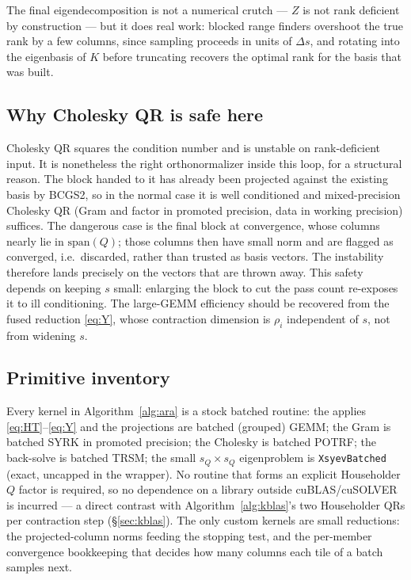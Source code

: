 \documentclass[11pt]{article}
\begin{document}
The final eigendecomposition is not a numerical crutch --- $Z$ is not rank
deficient by construction --- but it does real work: blocked range finders
overshoot the true rank by a few columns, since sampling proceeds in units of
$\Delta s$, and rotating into the eigenbasis of $K$ before truncating recovers
the optimal rank for the basis that was built.

\subsection{Why Cholesky QR is safe here}
\label{sec:cholqr}

Cholesky QR squares the condition number and is unstable on rank-deficient input.
It is nonetheless the right orthonormalizer inside this loop, for a structural
reason. The block handed to it has already been projected against the existing
basis by BCGS2, so in the normal case it is well conditioned and mixed-precision
Cholesky QR (Gram and factor in promoted precision, data in working precision)
suffices. The dangerous case is the final block at convergence, whose columns
nearly lie in $\mathrm{span}(Q)$; those columns then have small norm and are
flagged as converged, i.e.\ discarded, rather than trusted as basis vectors. The
instability therefore lands precisely on the vectors that are thrown away. This
safety depends on keeping $s$ small: enlarging the block to cut the pass count
re-exposes it to ill conditioning. The large-GEMM efficiency should be recovered
from the fused reduction \eqref{eq:Y}, whose contraction dimension is $\rho_i$
independent of $s$, not from widening $s$.

\subsection{Primitive inventory}
\label{sec:primitives}

Every kernel in Algorithm~\ref{alg:ara} is a stock batched routine:
the applies \eqref{eq:HT}--\eqref{eq:Y} and the projections are batched
(grouped) GEMM; the Gram is batched SYRK in promoted precision; the Cholesky is
batched POTRF; the back-solve is batched TRSM; the small $s_Q\times s_Q$
eigenproblem is \texttt{XsyevBatched} (exact, uncapped in the wrapper). No
routine that forms an explicit Householder $Q$ factor is required, so no
dependence on a library outside cuBLAS/cuSOLVER is incurred --- a direct
contrast with Algorithm~\ref{alg:kblas}'s two Householder QRs per contraction
step (\S\ref{sec:kblas}). The only custom kernels are
small reductions: the projected-column norms feeding the stopping test, and the
per-member convergence bookkeeping that decides how many columns each tile of a
batch samples next.
\end{document}
